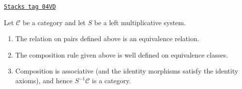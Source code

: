 \begin{lemma}
\label{categories-lemma-left-localization}
\href{https://stacks.math.columbia.edu/tag/04VD}{\texttt{Stacks tag 04VD}}

Let $\mathcal{C}$ be a category and let $S$ be a left multiplicative
system.
\begin{enumerate}
\item The relation on pairs defined above is an equivalence relation.
\item The composition rule given above is well defined on equivalence
classes.
\item Composition is associative (and the identity morphisms satisfy
the identity axioms), and hence $S^{-1}\mathcal{C}$ is a category.
\end{enumerate}
\end{lemma}

